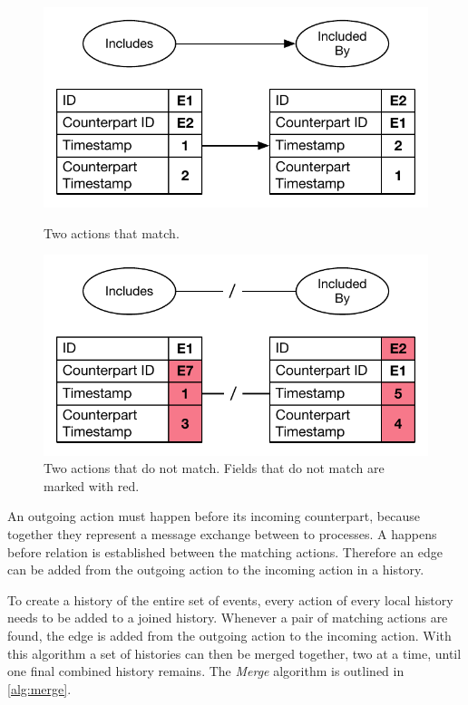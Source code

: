     \begin{figure}[H]
		\centering
		\begin{minipage}{0.45\textwidth}
			\centering
			\includegraphics[width=\textwidth]{4connect/images/actions-match.pdf}
			\caption{Two actions that match.}
			\label{fig:connect:actions-match}
		\end{minipage}\hfill
		\begin{minipage}{0.45\textwidth}
			\centering
			\includegraphics[width=\textwidth]{4connect/images/actions-do-not-match.pdf}
            \caption{Two actions that do not match. Fields that do not match are marked with red.}
            \label{fig:connect:actions-do-not-match}
		\end{minipage}
    \end{figure}
        
    \noindent An outgoing action must happen before its incoming counterpart, because together they represent a message exchange between to processes. A happens before relation is established between the matching actions. Therefore an edge can be added from the outgoing action to the incoming action in a history.

	\newpar To create a history of the entire set of events, every action of every local history needs to be added to a joined history. Whenever a pair of matching actions are found, the edge is added from the outgoing action to the incoming action. With this algorithm a set of histories can then be merged together, two at a time, until one final combined history remains. The \textit{Merge} algorithm is outlined in \autoref{alg:merge}.
	
